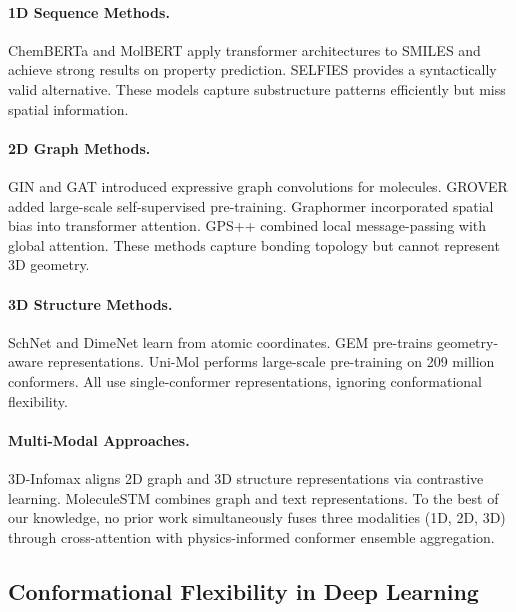 \documentclass[11pt]{article}
\begin{document}
\paragraph{1D Sequence Methods.}
ChemBERTa \citep{chithrananda2020chemberta} and MolBERT \citep{fabian2020molecular} apply transformer architectures to SMILES and achieve strong results on property prediction. SELFIES \citep{krenn2020selfies} provides a syntactically valid alternative. These models capture substructure patterns efficiently but miss spatial information.

\paragraph{2D Graph Methods.}
GIN \citep{xu2019powerful} and GAT \citep{velickovic2018graph} introduced expressive graph convolutions for molecules. GROVER \citep{rong2020grover} added large-scale self-supervised pre-training. Graphormer \citep{ying2021transformers} incorporated spatial bias into transformer attention. GPS++ \citep{masters2023gps} combined local message-passing with global attention. These methods capture bonding topology but cannot represent 3D geometry.

\paragraph{3D Structure Methods.}
SchNet \citep{schutt2017schnet} and DimeNet \citep{gasteiger2020directional} learn from atomic coordinates. GEM \citep{fang2022geometry} pre-trains geometry-aware representations. Uni-Mol \citep{zhou2023unimol} performs large-scale pre-training on 209 million conformers. All use single-conformer representations, ignoring conformational flexibility.

\paragraph{Multi-Modal Approaches.}
3D-Infomax \citep{stark20223d} aligns 2D graph and 3D structure representations via contrastive learning. MoleculeSTM \citep{liu2022multimodal} combines graph and text representations. To the best of our knowledge, no prior work simultaneously fuses three modalities (1D, 2D, 3D) through cross-attention with physics-informed conformer ensemble aggregation.

\subsection{Conformational Flexibility in Deep Learning}
\end{document}
